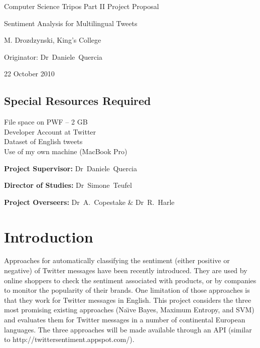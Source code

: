 \vfil

\centerline{\Large Computer Science Tripos Part II Project Proposal}
\vspace{0.4in}
\centerline{\Large Sentiment Analysis for Multilingual Tweets}
\vspace{0.4in}
\centerline{\large M. Drozdzynski, King's College}
\vspace{0.3in}
\centerline{\large Originator: Dr~Daniele~Quercia}
\vspace{0.3in}
\centerline{\large 22 October 2010}

\vfil

\subsection*{Special Resources Required}

File space on PWF -- 2 GB \\
Developer Account at Twitter \\
Dataset of English tweets \\
Use of my own machine (MacBook Pro)

\vspace{0.2in}

\noindent
{\bf Project Supervisor:} Dr~Daniele~Quercia
\vspace{0.2in}

\noindent
{\bf Director of Studies:} Dr~Simone~Teufel
\vspace{0.2in}
\noindent

\noindent
{\bf Project Overseers:} Dr~A.~Copestake \& Dr~R.~Harle

\vfil
\pagebreak

\section{Introduction}

Approaches for automatically classifying the sentiment (either positive or negative) of Twitter messages have been recently introduced. They are used by online shoppers to check the sentiment associated with products, or by companies to monitor the popularity of their brands. One limitation of those approaches is that they work for Twitter messages in English. This project considers the three most promising existing approaches (Na\"{\i}ve Bayes, Maximum Entropy, and SVM) and evaluates them for Twitter messages in a number of continental European languages. The three approaches will be made available through an API (similar to http://twittersentiment.appspot.com/).

